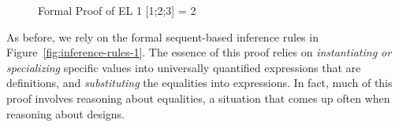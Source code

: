\begin{figure}[t]
    \centering \begin{footnotesize}
  \end{footnotesize}

    \caption{Formal Proof of EL 1 [1;2;3] = 2}
\label{fig:proof-2}
\end{figure}

As before, we rely on the formal sequent-based inference rules in
Figure~\ref{fig:inference-rules-1}. The essence of this proof relies
on \emph{instantiating or specializing} specific values into
universally quantified expressions that are definitions, and
\emph{substituting} the equalities into expressions. In fact, much of
this proof involves reasoning about equalities, a situation that comes
up often when reasoning about designs.

